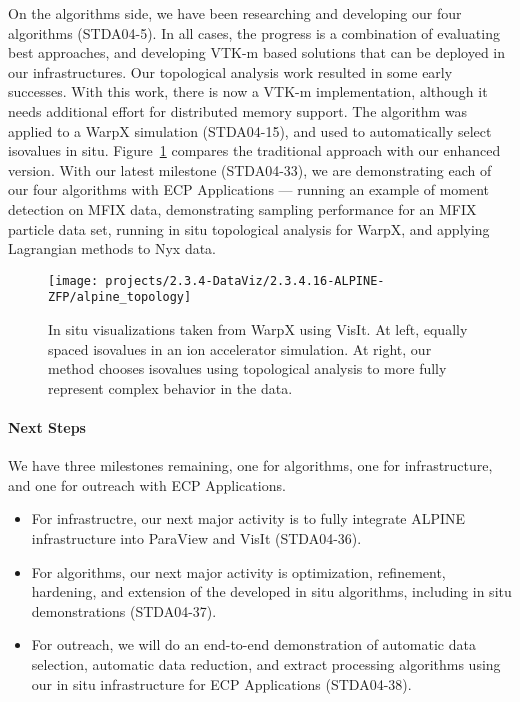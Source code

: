 On the algorithms side, we have been researching and developing our four algorithms (STDA04-5).
%
In all cases, the progress is a combination of evaluating best approaches, and developing VTK-m based solutions that
can be deployed in our infrastructures.
%
Our topological analysis work resulted in some early successes.
%
With this work, there is now a VTK-m implementation, although it needs additional effort for distributed memory support.
%
The algorithm was applied to a WarpX simulation (STDA04-15), and used to automatically select isovalues in situ.
%
Figure~\ref{fig:alpine_topology} compares the traditional approach with our enhanced version.
%
With our latest milestone (STDA04-33), we are demonstrating each of our four algorithms with ECP Applications --- running an example of moment detection on MFIX data, demonstrating sampling performance for an MFIX particle data set, running in situ topological analysis for WarpX, and applying Lagrangian methods to Nyx data.

\begin{figure}[htb]
	\centering
	\texttt{[image: projects/2.3.4-DataViz/2.3.4.16-ALPINE-ZFP/alpine\_topology]}
	\caption{\label{fig:alpine_topology}In situ visualizations taken from WarpX using VisIt.  At left, equally spaced isovalues in an ion accelerator simulation. At right, our method chooses isovalues using topological analysis to more fully represent complex behavior in the data.}
\end{figure}


\paragraph{Next Steps}

We have three milestones remaining, one for algorithms, one for infrastructure, and one for outreach with ECP Applications.
\begin{itemize}
        \setlength{\itemsep}{1pt}
        \setlength{\parskip}{0pt}
        \setlength{\parsep}{0pt}
\item For infrastructre, our next major activity is to fully integrate ALPINE infrastructure into ParaView and VisIt (STDA04-36).
\item For algorithms, our next major activity is optimization, refinement, hardening, and extension of the developed in situ algorithms, including in situ demonstrations (STDA04-37).
\item For outreach, we will do an end-to-end demonstration of automatic data selection, automatic data reduction, and extract processing algorithms using  our in situ infrastructure for ECP Applications (STDA04-38).
\end{itemize}
